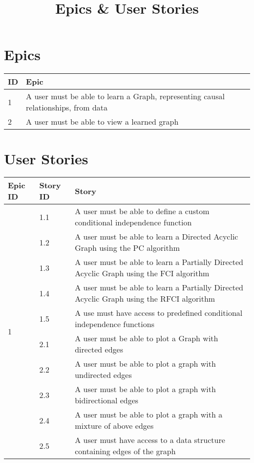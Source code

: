 \documentclass{article}
\begin{document}
\title{Epics \& User Stories}
\date{}
\maketitle
\section{Epics}
\begin{tabular}{| l | p{12cm} |}
	\hline	
	ID & Epic \\
	\hline
	1 & A user must be able to learn a Graph, representing causal relationships, from data \\
	\hline
	2 & A user must be able to view a learned graph \\
	\hline
\end{tabular}

\section{User Stories}

\begin{tabular}{| l | l | p{9.5cm} |}
	\hline
	Epic ID & Story ID & Story \\
	\hline
	\multirow{10}{*}{1} & 1.1 & A user must be able to define a custom conditional independence  function\\
	\cline{2-3}
	& 1.2 & A user  must be able to learn a Directed Acyclic Graph using  the PC algorithm \\
	\cline{2-3}
	& 1.3 & A user  must be able to learn a Partially Directed Acyclic Graph using  the FCI algorithm \\
	\cline{2-3}
	& 1.4 & A user  must be able to learn a Partially Directed Acyclic Graph using  the RFCI algorithm \\
	\cline{2-3}
	& 1.5 & A use must have access to predefined conditional independence functions \\
	\hline
	\multirow{7}{*}{2} & 2.1 & A user must be able to plot a Graph with directed edges\\
	\cline{2-3}
	& 2.2 & A user  must be able to plot a graph with undirected edges \\
	\cline{2-3}
	& 2.3 & A user must be able to plot a graph with bidirectional edges \\
	\cline{2-3}
	& 2.4 & A user must be able to plot a graph with a mixture of above edges \\
	\cline{2-3}
	& 2.5 & A user must have access to a data structure containing edges of the graph \\
	\hline
	 
\end{tabular}
\end{document}
